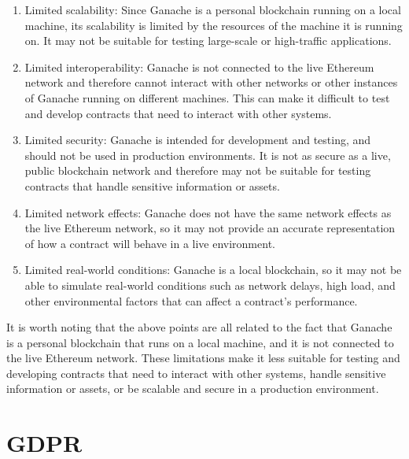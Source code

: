 \documentclass[target=mst,aauheader=]{thud}
\begin{document}
\begin{enumerate}

    \item Limited scalability: Since Ganache is a personal blockchain running on a local machine, its scalability is limited by the resources of the machine it is running on. It may not be suitable for testing large-scale or high-traffic applications.
    \item Limited interoperability: Ganache is not connected to the live Ethereum network and therefore cannot interact with other networks or other instances of Ganache running on different machines. This can make it difficult to test and develop contracts that need to interact with other systems.
    \item Limited security: Ganache is intended for development and testing, and should not be used in production environments. It is not as secure as a live, public blockchain network and therefore may not be suitable for testing contracts that handle sensitive information or assets.
    \item Limited network effects: Ganache does not have the same network effects as the live Ethereum network, so it may not provide an accurate representation of how a contract will behave in a live environment.
    \item Limited real-world conditions: Ganache is a local blockchain, so it may not be able to simulate real-world conditions such as network delays, high load, and other environmental factors that can affect a contract's performance.

\end{enumerate}

It is worth noting that the above points are all related to the fact that Ganache is a personal blockchain that runs on a local machine, and it is not connected to the live Ethereum network. These limitations make it less suitable for testing and developing contracts that need to interact with other systems, handle sensitive information or assets, or be scalable and secure in a production environment.

\chapter{GDPR}
\end{document}
